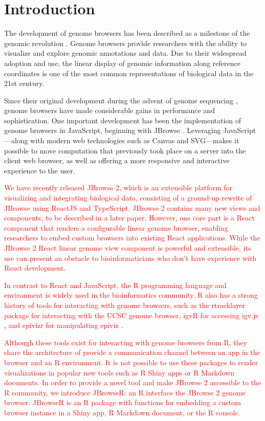 \documentclass{bioinfo}
\begin{document}
\section{Introduction}

The development of genome browsers has been described as a milestone of
the genomic revolution \citep{packer2007clickable}. Genome browsers
provide researchers with the ability to visualize and explore genomic
annotations and data. Due to their widespread adoption and use, the
linear display of genomic information along reference coordinates is one
of the most common representations of biological data in the 21st
century.

Since their original development during the advent of genome sequencing
\citep{kent2002human, birney2004overview}, genome browsers have made
considerable gains in performance and sophistication. One important
development has been the implementation of genome browsers in
JavaScript, beginning with JBrowse \citep{buels2016jbrowse}. Leveraging
JavaScript---along with modern web technologies such as Canvas and
SVG---makes it possible to move computation that previously took place
on a server into the client web browser, as well as offering a more
responsive and interactive experience to the user.

\textcolor{red}{
We have recently released JBrowse 2, which is an extensible platform for visualizing 
and integrating biological data, consisting of a ground-up rewrite of JBrowse using ReactJS and TypeScript.
JBrowse 2 contains many new views and components, to be described in a later paper.
However, one core part is a React component that renders a configurable
linear genome browser, enabling researchers to embed custom browsers into existing React applications.
While the JBrowse 2 React linear genome view component is powerful and extensible, its use can
present an obstacle to bioinformaticians who don't have experience with React development.}

\textcolor{red}{
In contrast to React and JavaScript, the R programming language and environment is widely used in the 
bioinformatics community. R also has a strong history of tools for interacting with genome browsers,
such as the rtracklayer} \citep{lawrence2009rtracklayer}
\textcolor{red}{package for interacting with the 
UCSC genome browser, igvR for accessing igv.js}
\citep{robinson2011integrative, robinson2017variant},
\textcolor{red}{and epivizr for manipulating epiviz}
\citep{chelaru2014epiviz}.

\textcolor{red}{
Although these tools exist for interacting with genome browsers from R, they share the architecture of
provide a communication channel between an app in the browser and an R environment. It is not possible
to use these packages to render visualizations in popular new tools such as R Shiny apps or R Markdown
documents. In order to provide a novel tool and make JBrowse 2 accessible to the R community, we
introduce JBrowseR: an R interface the JBrowse 2 genome browser. 
JBrowseR is an R package with functions for embedding a custom browser instance in a Shiny app, 
R Markdown document, or the R console.}
\end{document}

